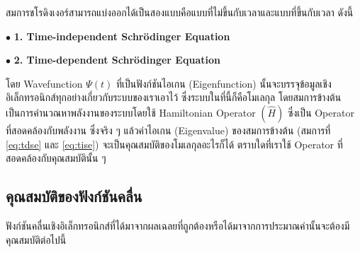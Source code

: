 สมการชโรดิงเงอร์สามารถแบ่งออกได้เป็นสองแบบคือแบบที่ไม่ขึ้นกับเวลาและแบบที่ขึ้นกับเวลา ดังนี้

\noindent $\bullet$ \textbf{1. Time-independent Schr\"{o}dinger Equation}


\noindent $\bullet$ \textbf{2. Time-dependent Schr\"{o}dinger Equation}


โดย Wavefunction $\Psi(t)$ ที่เป็นฟังก์ชันไอเกน (Eigenfunction) นั้นจะบรรจุข้อมูลเชิงอิเล็กทรอนิกส์ทุกอย่างเกี่ยวกับระบบของเราเอาไว้%
\autocite{szabo1996,cramer2004,jensen2017} ซึ่งระบบในที่นี้ก็คือโมเลกุล โดยสมการข้างต้นเป็นการคำนวณหาพลังงานของระบบโดยใช้
Hamiltonian Operator $(\hat{H})$ ซึ่งเป็น Operator ที่สอดคล้องกับพลังงาน ซึ่งจริง ๆ แล้วค่าไอเกน (Eigenvalue) ของสมการข้างต้น
(สมการที่ \eqref{eq:tdse} และ \eqref{eq:tise}) จะเป็นคุณสมบัติของโมเลกุลอะไรก็ได้ ตราบใดที่เราใช้ Operator ที่สอดคล้องกับคุณสมบัตินั้น ๆ

\subsection{คุณสมบัติของฟังก์ชันคลื่น}
\label{ssec:wavefunc_prop}

ฟังก์ชันคลื่นเชิงอิเล็กทรอนิกส์ที่ได้มาจากผลเฉลยที่ถูกต้องหรือได้มาจากการประมาณค่านั้นจะต้องมีคุณสมบัติต่อไปนี้


